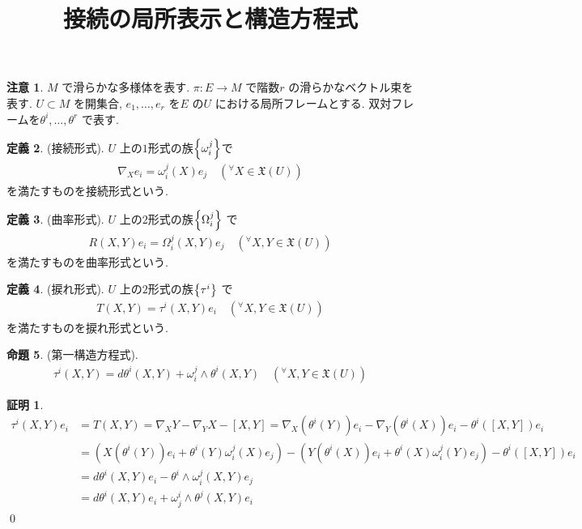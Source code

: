\documentclass[10pt, fleqn, label-section=none]{bxjsarticle}
\title{接続の局所表示と構造方程式}
\date{}
\author{}
\theoremstyle{definition}
\newtheorem{dfn}{定義}[section]
\newtheorem{prop}[dfn]{命題}
\newtheorem*{pf*}{証明}
\newtheorem{remark}[dfn]{注意}
\newcommand{\any}{{}^{\forall}}
\newcommand{\cbra}[1]{\mleft\{#1\mright\}}
\renewcommand{\;}{\, ; \,}
\begin{document}
\maketitle



\section{}

\begin{remark}
$M$ で滑らかな多様体を表す. $\pi: E \rightarrow M$ で階数$r$ の滑らかなベクトル束を表す. $U \subset M$ を開集合, $e_1, \ldots, e_r$ を$E$ の$U$ における局所フレームとする. 双対フレームを$\theta^i, \ldots, \theta^r$ で表す.
\end{remark}

\begin{dfn}(接続形式).
$U$ 上の$1$形式の族$\cbra{\omega_i^j}$で
\begin{align*} \nabla_X e_i = \omega_i^j (X) e_j \quad (\any X \in \mathfrak X (U))\end{align*}
を満たすものを接続形式という.
\end{dfn}

\begin{dfn}(曲率形式). 
$U$ 上の$2$形式の族$\cbra{\Omega_i^j}$ で
\begin{align*} R(X,Y)e_i = \Omega_i^j(X,Y) e_j \quad (\any X, Y \in \mathfrak X (U))\end{align*}
を満たすものを曲率形式という. 
\end{dfn}

\begin{dfn}(捩れ形式).
$U$ 上の$2$形式の族$\cbra{\tau^i}$ で
\begin{align*} T(X,Y) = \tau^i (X,Y) e_i \quad (\any X, Y \in \mathfrak X (U)) \end{align*}
を満たすものを捩れ形式という.
\end{dfn}

\begin{prop}(第一構造方程式).
\begin{align*} \tau ^i (X,Y) = d\theta^i (X,Y) + \omega_i^j \wedge \theta^i (X,Y) \quad (\any X, Y \in \mathfrak X (U)) \end{align*}
\end{prop}
\begin{pf*}
\begin{align*} \tau^i (X,Y) e_i &= T(X,Y) = \nabla_X Y - \nabla_Y X - [X,Y] = \nabla_X (\theta^i (Y))e_i -\nabla_Y(\theta ^i (X))e_i - \theta^i ([X,Y])e_i 
\\&= (X(\theta^i (Y)) e_i + \theta^i(Y) \omega_i^j (X) e_j ) - (Y(\theta^i (X)) e_i + \theta^i(X) \omega_i^j (Y) e_j ) - \theta^i ([X,Y]) e_i 
\\&= d\theta^i (X,Y) e_i  - \theta^i \wedge \omega_i^j (X,Y) e_j  \\ &=  d\theta^i (X,Y) e_i  + \omega_j^i  \wedge \theta ^j (X,Y) e_i \end{align*}
\qed
\end{pf*}
\end{document}
